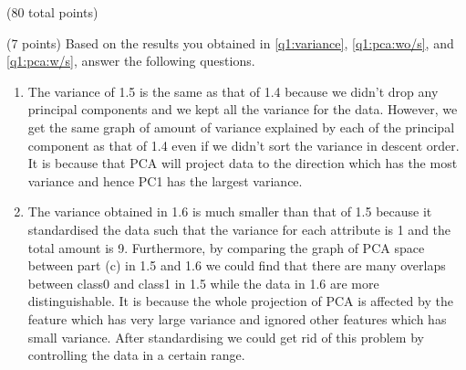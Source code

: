 \documentclass[12pt]{article}
\begin{document}
\begin{question}{(80 total points) \qOneTitle}
\begin{subquestion}{(7 points)
    Based on the results you obtained in \ref{q1:variance}, \ref{q1:pca:wo/s}, and \ref{q1:pca:w/s}, answer the following questions.
  }
  \begin{answerbox}{0.35\textheight}
    \begin{enumerate}
    \item The variance of 1.5 is the same as that of 1.4 because we didn't drop any principal components and we kept all the variance for the data. However, we get the same graph of amount of variance explained by each of the principal component as that of 1.4 even if we didn't sort the variance in descent order. It is because that PCA will project data to the direction which has the most variance and hence PC1 has the largest variance.
    \item The variance obtained in 1.6 is much smaller than that of 1.5 because it standardised the data such that the variance for each attribute is 1 and the total amount is 9. Furthermore, by comparing the graph of PCA space between part (c) in 1.5 and 1.6 we could find that there are many overlaps between class0 and class1 in 1.5 while the data in 1.6 are more distinguishable. It is because the whole projection of PCA is affected by the feature which has very large variance and ignored other features which has small variance. After standardising we could get rid of this problem by controlling the data in a certain range.
    \end{enumerate}
  \end{answerbox}
  

  
\end{subquestion}


\end{question}
\end{document}
